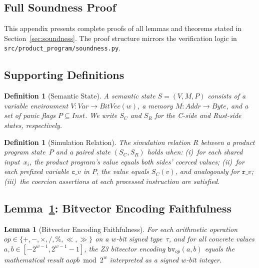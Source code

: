 \documentclass[10pt,a4paper]{article}
\newtheorem{lemma}[theorem]{Lemma}
\newtheorem{definition}[theorem]{Definition}
\begin{document}
\clearpage
\begin{appendices}

\section{Full Soundness Proof}\label{app:proofs}

This appendix presents complete proofs of all lemmas and theorems
stated in Section~\ref{sec:soundness}.  The proof structure mirrors
the verification logic in
\texttt{src/product\_program/soundness.py}.

\subsection{Supporting Definitions}

\begin{definition}[Semantic State]\label{def:semstate}
A semantic state $S = (V, M, P)$ consists of a variable environment
$V: \mathit{Var} \to \mathit{BitVec}(w)$, a memory
$M: \mathit{Addr} \to \mathit{Byte}$, and a set of panic flags
$P \subseteq \mathit{Inst}$.  We write $S_C$ and $S_R$ for the
C-side and Rust-side states, respectively.
\end{definition}

\begin{definition}[Simulation Relation]\label{def:simrel}
The simulation relation $R$ between a product program state~$P$ and
a paired state $(S_C, S_R)$ holds when:
(i)~for each shared input~$x_i$, the product program's value equals
both sides' coerced values;
(ii)~for each prefixed variable $\texttt{c\_}v$ in $P$, the value
equals $S_C(v)$, and analogously for $\texttt{r\_}v$;
(iii)~the coercion assertions at each processed instruction are
satisfied.
\end{definition}

\subsection{Lemma~\ref{lem:bv-faithful}: Bitvector Encoding
Faithfulness}

\begin{lemma}[Bitvector Encoding Faithfulness]\label{lem:bv-faithful}
For each arithmetic operation $op \in \{+, -, \times, /, \%,
\ll, \gg\}$ on a $w$-bit signed type~$\tau$, and for all concrete
values $a, b \in [-2^{w-1}, 2^{w-1}-1]$, the Z3 bitvector encoding
$\texttt{bv}_{op}(a, b)$ equals the mathematical result
$a \mathbin{op} b \bmod 2^w$ interpreted as a signed $w$-bit integer.
\end{lemma}


\end{appendices}
\end{document}
